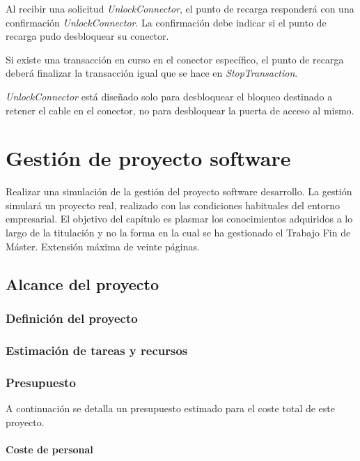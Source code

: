 \documentclass[12pt,a4paper,onecolumn,oneside]{report}
\begin{document}
Al recibir una solicitud \textit{UnlockConnector}, el punto de recarga responderá con una confirmación \textit{UnlockConnector}. La confirmación debe indicar si el punto de recarga pudo desbloquear su conector. 

Si existe una transacción en curso en el conector específico, el punto de recarga deberá finalizar la transacción igual que se hace en \textit{StopTransaction}.

\textit{UnlockConnector} está diseñado solo para desbloquear el bloqueo destinado a retener el cable en el conector, no para desbloquear la puerta de acceso al mismo.




\chapter{Gestión de proyecto software}
\label{Gestión de proyecto software}

Realizar una simulación de la gestión del proyecto software desarrollo. La gestión simulará un proyecto real, realizado con las condiciones habituales del entorno empresarial. El objetivo del capítulo es plasmar los conocimientos adquiridos a lo largo de la titulación y no la forma en la cual se ha gestionado el Trabajo Fin de Máster. Extensión máxima de veinte páginas.

\section{Alcance del proyecto}
\label{Alcance del proyecto}

\subsection{Definición del proyecto}

\subsection{Estimación de tareas y recursos}

\subsection{Presupuesto}

A continuación se detalla un presupuesto estimado para el coste total de este proyecto.

\subsubsection{Coste de personal}
\end{document}
